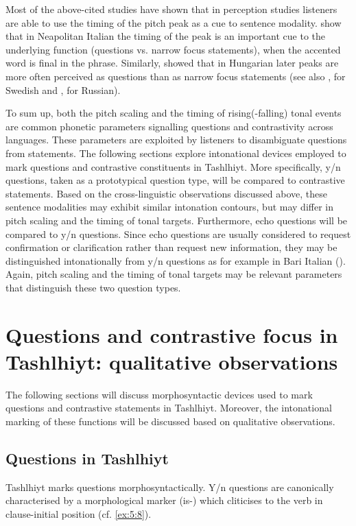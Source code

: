 Most of the above-cited studies have shown that in perception studies listeners are able to use the timing of the pitch peak as a cue to sentence modality. \citet{DimperioHouse1997} show that in Neapolitan Italian  the timing of the peak is an important cue to the underlying function (questions vs. narrow focus statements), when the accented word is final in the phrase. Similarly, \citet{GosyTerken1994} showed that in Hungarian later peaks are more often perceived as questions than as narrow focus statements (see also \citealt{House2003}, for Swedish and \citealt{Makarova2007}, for Russian).  

To sum up, both the pitch scaling and the timing of rising(-falling) tonal events are common phonetic parameters signalling questions and contrastivity across languages. These parameters are exploited by listeners to disambiguate questions from statements. The following sections explore intonational devices employed to mark questions and contrastive constituents in Tashlhiyt. More specifically, y/n questions, taken as a prototypical question type, will be compared to contrastive statements. Based on the cross-linguistic observations discussed above, these sentence modalities may exhibit similar intonation contours, but may differ in pitch scaling and the timing of tonal targets. Furthermore, echo questions will be compared to y/n questions. Since echo questions are usually considered to request confirmation or clarification rather than request new information, they may be distinguished intonationally from y/n questions as for example in Bari Italian  (\citealt{SavinoGrice2011}). Again, pitch scaling and the timing of tonal targets may be relevant parameters that distinguish these two question types. 

\section{Questions and contrastive focus in Tashlhiyt: qualitative observations}\label{sec:5.4}
The following sections will discuss morphosyntactic devices used to mark questions and contrastive statements in Tashlhiyt. Moreover, the intonational marking of these functions will be discussed based on qualitative observations. 

\subsection{Questions in Tashlhiyt}\label{sec:5.4.1}
Tashlhiyt marks questions morphosyntactically. Y/n questions are canonically characterised by a morphological marker (is-) which cliticises to the verb in clause-initial position (cf. \ref{ex:5:8}). 

